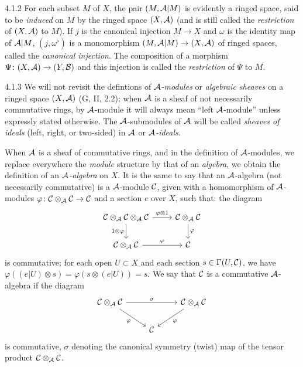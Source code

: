 \begin{env}{4.1.2}
For each subset $M$ of $X$, the pair $(M,\mathcal{A}|M)$ is evidently a ringed space, said
to be \emph{induced} on $M$ by the ringed space $(X,\mathcal{A})$ (and is still called
the \emph{restriction} of $(X,\mathcal{A})$ to $M$). If $j$ is the canonical injection
$M\to X$ and $\omega$ is the identity map of $\mathcal{A}|M$, $(j,\omega^\flat)$ is a
monomorphism $(M,\mathcal{A}|M)\to(X,\mathcal{A})$ of ringed spaces, called the
\emph{canonical injection}. The composition of a morphism
$\Psi\colon(X,\mathcal{A})\to(Y,\mathcal{B})$ and this injection is called the \emph{restriction}
of $\Psi$ to $M$.
\end{env}

\begin{env}{4.1.3}
We will not revisit the defintions of \emph{$\mathcal{A}$-modules} or
\emph{algebraic sheaves} on a ringed space $(X,\mathcal{A})$ (G, II, 2.2);
when $\mathcal{A}$ is a sheaf of not necessarily commutative rings, by $\mathcal{A}$-module
it will always mean ``left $\mathcal{A}$-module'' unless expressly stated otherwise. The
$\mathcal{A}$-submodules of $\mathcal{A}$ will be called \emph{sheaves of ideals} (left,
right, or two-sided) in $\mathcal{A}$ or \emph{$\mathcal{A}$-ideals}.

When $\mathcal{A}$ is a sheaf of commutative rings, and in the definition of
$\mathcal{A}$-modules, we replace everywhere the \emph{module} structure by that of
an \emph{algebra}, we obtain the definition of an \emph{$\mathcal{A}$-algebra} on $X$.
It is the same to say that an $\mathcal{A}$-algebra (not necessarily commutative) is
a $\mathcal{A}$-module $\mathcal{C}$, given with a homomorphism of $\mathcal{A}$-modules
$\varphi\colon\mathcal{C}\otimes_{\mathcal{A}}\mathcal{C}\to\mathcal{C}$ and a section $e$ over $X$,
such that:  the diagram
\[
  \begin{tikzcd}
    \sheaf{C}\otimes_{\sheaf{A}}\sheaf{C}\otimes_{\sheaf{A}}\sheaf{C}
    \ar[r,"\varphi\otimes 1"]\ar[d,"1\otimes\varphi"'] &
    \sheaf{C}\otimes_{\sheaf{A}}\sheaf{C}\ar[d,"\varphi"]\\
    \sheaf{C}\otimes_{\sheaf{A}}\sheaf{C}\ar[r,"\varphi"] & \sheaf{C}
  \end{tikzcd}
\]
is commutative;  for each open $U\subset X$ and each section $s\in\Gamma(U,\mathcal{C})$,
we have $\varphi((e|U)\otimes s)=\varphi(s\otimes(e|U))=s$. We say that $\mathcal{C}$ is a
commutative $\mathcal{A}$-algebra if the diagram
\[
  \begin{tikzcd}
    \sheaf{C}\otimes_{\sheaf{A}}\sheaf{C}\ar[rr,"\sigma"]\ar[rd,"\varphi"']
    & & \sheaf{C}\otimes_{\sheaf{A}}\sheaf{C}\ar[ld,"\varphi"]\\
   & \sheaf{C}
  \end{tikzcd}
\]
is commutative, $\sigma$ denoting the canonical symmetry (twist) map of the tensor product
$\mathcal{C}\otimes_{\mathcal{A}}\mathcal{C}$.


\end{env}
